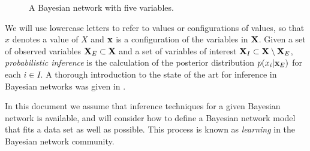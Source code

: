\begin{figure}[htb]
  \begin{center}
   \scalebox{1}{
    \begin{tikzpicture}

    \simpleModel
    \end{tikzpicture}
    }
  \end{center}
  \caption{A Bayesian network with five variables.}
  \label{fig:sampleBN}
\end{figure}


We will use lowercase letters to refer to
values or configurations of values, so that $x$ denotes a value of $X$ and $\mathbf{x}$ is a configuration of the
variables in $\mathbf{X}$. 
Given a set of observed variables $\mathbf{X}_E\subset \mathbf{X}$ and a set of variables of interest $\mathbf{X}_I\subset \mathbf{X} \setminus \mathbf{X}_E$,
\emph{probabilistic inference} is the calculation  of the posterior distribution
$p(x_i|\mathbf{x}_E)$ for each $i\in I$. 
A thorough introduction to the state of the art for inference in Bayesian networks was given in \cite{AMIDST-D31}. 

In this document we assume that inference techniques for a given Bayesian network is available, and will consider how to define a Bayesian network model that fits a data set as well as possible.
This process is known as \textit{learning} in the Bayesian network community.



